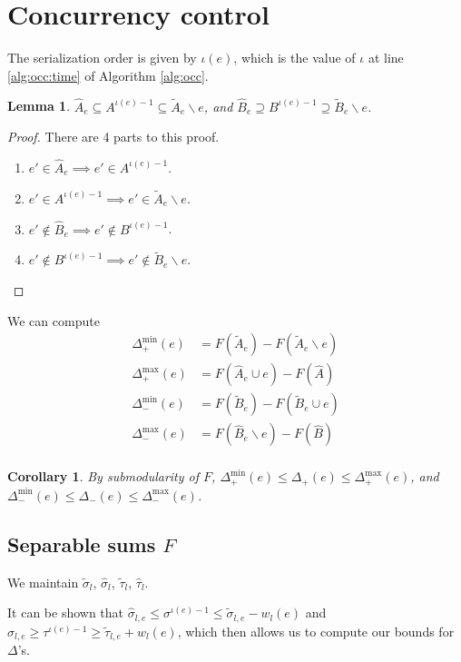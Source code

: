 \documentclass{article} %
\newtheorem{cor}[thm]{Corollary}
\newtheorem{lem}[thm]{Lemma}
\begin{document}
\section{Concurrency control}

The serialization order is given by $\iota(e)$, which is the value of $\iota$ at line \ref{alg:occ:time} of Algorithm \ref{alg:occ}.

\begin{lem} $\hat{A}_e \subseteq A^{\iota(e)-1} \subseteq \tilde{A}_e \backslash e$, and $\hat{B}_e \supseteq B^{\iota(e)-1} \supseteq \tilde{B}_e \backslash e$.
\end{lem}
\begin{proof}
There are 4 parts to this proof.
\begin{enumerate}
\item $e' \in \hat{A}_e \implies e' \in A^{\iota(e)-1}$.
\item $e' \in A^{\iota(e)-1} \implies e' \in\tilde{A}_e \backslash e$.
\item $e' \not\in \hat{B}_e \implies e' \not\in B^{\iota(e)-1}$.
\item $e' \not\in B^{\iota(e)-1} \implies e' \not\in\tilde{B}_e \backslash e$.
\end{enumerate}
\end{proof}

We can compute
\begin{align*}
\Delta_+^{\min}(e) &= F(\tilde{A}_e) - F(\tilde{A}_e \backslash e)\\
\Delta_+^{\max}(e) &= F(\hat{A}_e \cup e) - F(\hat{A})\\
\Delta_-^{\min}(e) &= F(\tilde{B}_e) - F(\tilde{B}_e \cup e)\\
\Delta_-^{\max}(e) &= F(\hat{B}_e \backslash e) - F(\hat{B})\\
\end{align*}

\begin{cor} By submodularity of $F$, $\Delta_+^{\min}(e) \leq \Delta_+(e) \leq \Delta_+^{\max}(e)$, and $\Delta_-^{\min}(e) \leq \Delta_-(e) \leq \Delta_-^{\max}(e)$.
\end{cor}

\subsection{Separable sums $F$}
We maintain $\tilde\sigma_l$, $\hat\sigma_l$, $\tilde\tau_l$, $\hat\tau_l$.

It can be shown that $\hat\sigma_{l,e} \leq \sigma^{\iota(e)-1} \leq \tilde\sigma_{l,e} - w_l(e)$ and $\hat\sigma_{l,e} \geq \tau^{\iota(e)-1} \geq \tilde\tau_{l,e} + w_l(e)$, which then allows us to compute our bounds for $\Delta$'s.
\end{document}
